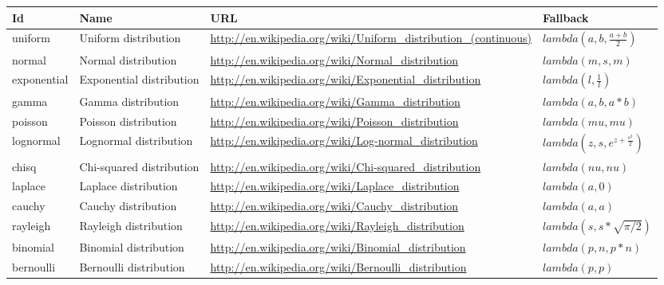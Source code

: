 \documentclass[draftspec]{sbmlpkgspec}
\begin{document}
\begin{longtabu} to \linewidth {
    X[2,c]
    X[3,c]
    X[12,c]
    X[4,l]}
\textbf{Id} & \textbf{Name} & \textbf{URL} & \textbf{Fallback} \\ \midrule
uniform & Uniform distribution & \footnotesize{\url{http://en.wikipedia.org/wiki/Uniform_distribution_(continuous)}} &\small{$lambda(a,b,\frac{a+b}{2})$}
\\ \midrule
normal & Normal distribution & \footnotesize{\url{http://en.wikipedia.org/wiki/Normal_distribution}} &\small{$lambda(m,s,m)$}
\\ \midrule
exponential & Exponential distribution & \footnotesize{\url{http://en.wikipedia.org/wiki/Exponential_distribution}} &\small{$lambda(l,\frac{1}{l})$}
\\ \midrule
gamma & Gamma distribution & \footnotesize{\url{http://en.wikipedia.org/wiki/Gamma_distribution}} &\small{$lambda(a,b,a*b)$}
\\ \midrule
poisson & Poisson distribution & \footnotesize{\url{http://en.wikipedia.org/wiki/Poisson_distribution}} &\small{$lambda(mu,mu)$}
\\ \midrule
lognormal & Lognormal distribution & \footnotesize{\url{http://en.wikipedia.org/wiki/Log-normal_distribution}} &\small{$lambda(z,s,e^{z+\frac{s^2}{2}})$}
\\ \midrule
chisq & Chi-squared distribution & \footnotesize{\url{http://en.wikipedia.org/wiki/Chi-squared_distribution}} &\small{$lambda(nu,nu)$}
\\ \midrule
laplace & Laplace distribution & \footnotesize{\url{http://en.wikipedia.org/wiki/Laplace_distribution}} &\small{$lambda(a,0)$}
\\ \midrule
cauchy & Cauchy distribution & \footnotesize{\url{http://en.wikipedia.org/wiki/Cauchy_distribution}} &\small{$lambda(a,a)$}
\\ \midrule
rayleigh & Rayleigh distribution & \footnotesize{\url{http://en.wikipedia.org/wiki/Rayleigh_distribution}} &\small{$lambda(s,s*\sqrt{\pi/2})$}
\\ \midrule
binomial & Binomial distribution & \footnotesize{\url{http://en.wikipedia.org/wiki/Binomial_distribution}} &\small{$lambda(p,n,p*n)$}
\\ \midrule
bernoulli & Bernoulli distribution & \footnotesize{\url{http://en.wikipedia.org/wiki/Bernoulli_distribution}} &\small{$lambda(p,p)$}
\\
\bottomrule
\end{longtabu}
\end{document}
